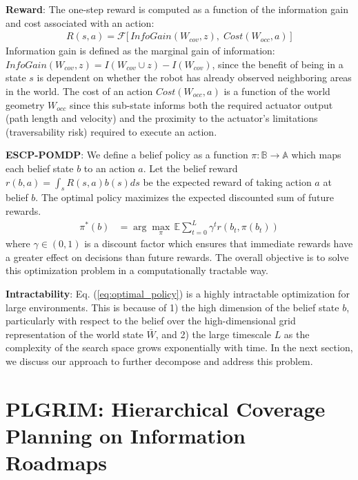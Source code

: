 \documentclass[letterpaper]{article} %
\newcommand{\ph}[1]{{\textbf{#1}:}} %
\begin{document}
\ph{Reward} The one-step reward is computed as a function of the information gain and cost associated with an action:
\begin{align}
    {R}(s, a) = \mathcal{F}\Big[\, \textit{InfoGain}(W_{cov}, z), \; \textit{Cost}(W_{occ}, a) \, \Big]%
\end{align}
Information gain is defined as the marginal gain of information: $\textit{InfoGain}(W_{cov}, z) = I(W_{cov} \cup z) - I(W_{cov})$, since the benefit of being in a state $s$ is dependent on whether the robot has already observed neighboring areas in the world. The cost of an action $Cost(W_{occ}, a)$ is a function of the world geometry $W_{occ}$ since this sub-state informs both the required actuator output (path length and velocity) and the proximity to the actuator's limitations (traversability risk) required to execute an action.

\ph{ESCP-POMDP} We define a belief policy as a function $\pi : \mathbb{B} \rightarrow \mathbb{A}$ which maps each belief state $b$ to an action $a$.  Let the belief reward $r(b,a)=\int_s R(s,a)b(s)ds$ be the expected reward of taking action $a$ at belief $b$.  The optimal policy maximizes the expected discounted sum of future rewards.
\begin{align}
  \pi^*(b) &= \arg\max_\pi \, \mathbb{E} \sum_{t=0}^{L} \gamma^t r(b_t, \pi(b_t)) 
  \label{eq:optimal_policy}
\end{align}
where $\gamma \in (0,1)$ is a discount factor which ensures that immediate rewards have a greater effect on decisions than future rewards. The overall objective is to solve this optimization problem in a computationally tractable way.

\ph{Intractability} 
Eq. (\ref{eq:optimal_policy}) is a highly intractable optimization for large environments. This is because of 1) the high dimension of the belief state $b$, particularly with respect to the belief over the high-dimensional grid representation of the world state $\bar{W}$, and 2) the large timescale $L$ as the complexity of the search space grows exponentially with time. In the next section, we discuss our approach to further decompose and address this problem.




\clearpage{}
\section{PLGRIM: Hierarchical Coverage Planning on Information Roadmaps}
\label{sec:plgrim}
\end{document}
